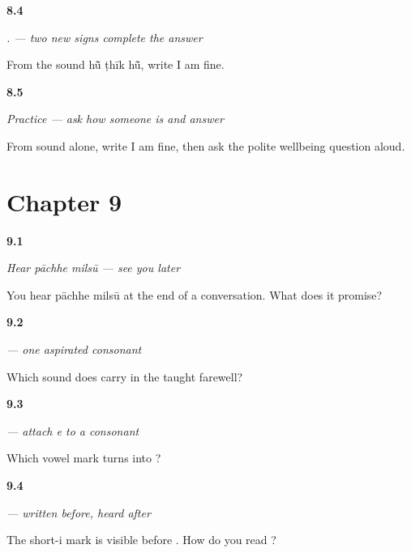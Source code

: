 \noindent\begin{minipage}[t]{\linewidth}
\raggedright
\hypertarget{review-MW-C06-answer-write}{\textbf{8.4}} \emph{  . — two new signs complete the answer}\par
\small From the sound hū̃ ṭhīk hū̃, write I am fine.
\end{minipage}\par\medskip

\noindent\begin{minipage}[t]{\linewidth}
\raggedright
\hypertarget{review-MW-C06-practice-wellbeing}{\textbf{8.5}} \emph{Practice — ask how someone is and answer}\par
\small From sound alone, write I am fine, then ask the polite wellbeing question aloud.
\end{minipage}\par\medskip

\section*{Chapter 9}

\noindent\begin{minipage}[t]{\linewidth}
\raggedright
\hypertarget{review-MW-C07-hear-later-meaning}{\textbf{9.1}} \emph{Hear \emph{pāchhe milsū} — see you later}\par
\small You hear pāchhe milsū at the end of a conversation. What does it promise?
\end{minipage}\par\medskip

\noindent\begin{minipage}[t]{\linewidth}
\raggedright
\hypertarget{review-MW-W07-chha-read}{\textbf{9.2}} \emph{ — one aspirated consonant}\par
\small Which sound does  carry in the taught farewell?
\end{minipage}\par\medskip

\noindent\begin{minipage}[t]{\linewidth}
\raggedright
\hypertarget{review-MW-W07-e-matra-build}{\textbf{9.3}} \emph{ — attach \emph{e} to a consonant}\par
\small Which vowel mark turns  into ?
\end{minipage}\par\medskip

\noindent\begin{minipage}[t]{\linewidth}
\raggedright
\hypertarget{review-MW-W07-i-matra-order}{\textbf{9.4}} \emph{ — written before, heard after}\par
\small The short-i mark is visible before . How do you read ?
\end{minipage}\par\medskip


